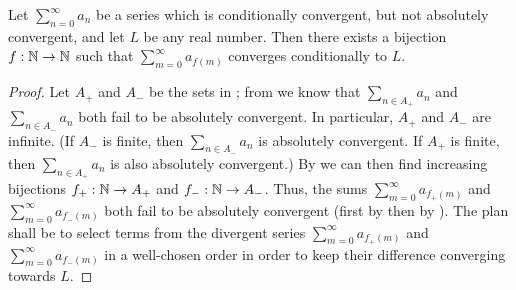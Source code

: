 \begin{thm}\label{i:8.2.8}
  Let \(\sum_{n = 0}^\infty a_n\) be a series which is conditionally convergent, but not absolutely convergent, and let \(L\) be any real number.
  Then there exists a bijection \(f : \mathbb{N} \to \mathbb{N}\) such that \(\sum_{m = 0}^\infty a_{f(m)}\) converges conditionally to \(L\).
\end{thm}

\begin{proof}
  Let \(A_+\) and \(A_-\) be the sets in ;
  from  we know that \(\sum_{n \in A_+} a_n\) and \(\sum_{n \in A_-} a_n\) both fail to be absolutely convergent.
  In particular, \(A_+\) and \(A_-\) are infinite.
  (If \(A_-\) is finite, then \(\sum_{n \in A_-} a_n\) is absolutely convergent.
  If \(A_+\) is finite, then \(\sum_{n \in A_+} a_n\) is also absolutely convergent.)
  By  we can then find increasing bijections \(f_+ : \mathbb{N} \to A_+\) and \(f_- : \mathbb{N} \to A_-\).
  Thus, the sums \(\sum_{m = 0}^\infty a_{f_+(m)}\) and \(\sum_{m = 0}^\infty a_{f_-(m)}\) both fail to be absolutely convergent (first by  then by ).
  The plan shall be to select terms from the divergent series \(\sum_{m = 0}^\infty a_{f_+(m)}\) and \(\sum_{m = 0}^\infty a_{f_-(m)}\) in a well-chosen order in order to keep their difference converging towards \(L\).


\end{proof}

